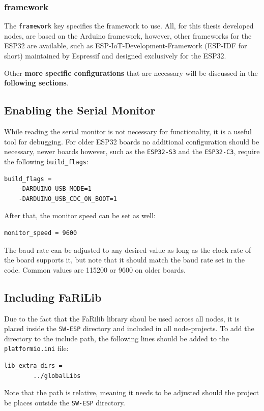         \subsubsection{framework}
        The \texttt{framework} key specifies the framework to use. All, for this 
        thesis developed nodes, are based on the Arduino framework, however, other
        frameworks for the ESP32 are available, such as ESP-IoT-Development-Framework
        (ESP-IDF for short) maintained by Espressif and designed exclusively for the 
        ESP32.
        
        Other \textbf{more specific 
        configurations} that are necessary will be discussed in the \textbf{following 
        sections}.

    \subsection{Enabling the Serial Monitor}
    While reading the serial monitor is not necessary for functionality, it is a
    useful tool for debugging. For older ESP32 boards no additional configuration 
    should be necessary, newer boards however, such as the \texttt{ESP32-S3} and the 
    \texttt{ESP32-C3}, require the following \texttt{build\_flags}: 
    \begin{lstlisting}[style=cppCode]
    build_flags =
    -DARDUINO_USB_MODE=1
    -DARDUINO_USB_CDC_ON_BOOT=1
    \end{lstlisting}
    After that, the monitor speed can be set as well:
    \begin{lstlisting}[style=cppCode]
    monitor_speed = 9600
    \end{lstlisting}
    The baud rate can be adjusted to any desired value as long as the clock rate
    of the board supports it, but note that it should match the baud rate set in 
    the code. Common values are 115200 or 9600 on older boards.

    \subsection{Including FaRiLib} \label{sec:farilib_include}
    Due to the fact that the FaRilib library shoul be used across all nodes, it is
    placed inside the \texttt{SW-ESP} directory and included in all node-projects.
    To add the directory to the include path, the following lines should be added to
    the \texttt{platformio.ini} file:
    \begin{lstlisting}[style=cppCode]
    lib_extra_dirs =
        ../globalLibs
    \end{lstlisting}
    Note that the path is relative, meaning it needs to be adjusted should the project
    be places outside the \texttt{SW-ESP} directory.